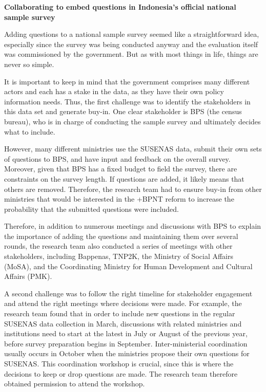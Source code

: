 \documentclass[
]{book}
\begin{document}
\begin{bbox}

\textbf{Collaborating to embed questions in Indonesia's official national sample survey}

Adding questions to a national sample survey seemed like a straightforward idea, especially since the survey was being conducted anyway and the evaluation itself was commissioned by the government. But as with most things in life, things are never so simple.

It is important to keep in mind that the government comprises many different actors and each has a stake in the data, as they have their own policy information needs. Thus, the first challenge was to identify the stakeholders in this data set and generate buy-in. One clear stakeholder is BPS (the census bureau), who is in charge of conducting the sample survey and ultimately decides what to include.

However, many different ministries use the SUSENAS data, submit their own sets of questions to BPS, and have input and feedback on the overall survey. Moreover, given that BPS has a fixed budget to field the survey, there are constraints on the survey length. If questions are added, it likely means that others are removed. Therefore, the research team had to ensure buy-in from other ministries that would be interested in the +BPNT\textbar{} reform to increase the probability that the submitted questions were included.

Therefore, in addition to numerous meetings and discussions with BPS to explain the importance of adding the questions and maintaining them over several rounds, the research team also conducted a series of meetings with other stakeholders, including Bappenas, TNP2K, the Ministry of Social Affairs (MoSA), and the Coordinating Ministry for Human Development and Cultural Affairs (PMK).

A second challenge was to follow the right timeline for stakeholder engagement and attend the right meetings where decisions were made. For example, the research team found that in order to include new questions in the regular SUSENAS data collection in March, discussions with related ministries and institutions need to start at the latest in July or August of the previous year, before survey preparation begins in September. Inter-ministerial coordination usually occurs in October when the ministries propose their own questions for SUSENAS. This coordination workshop is crucial, since this is where the decisions to keep or drop questions are made. The research team therefore obtained permission to attend the workshop.


\end{bbox}
\end{document}
